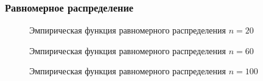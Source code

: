 \documentclass{article}
\begin{document}
\newpage
\subsubsection{Равномерное распределение}

\begin{figure}[h]
\caption{Эмпирическая функция равномерного распределения $n=20$}
\end{figure}

\begin{figure}[h]
\caption{Эмпирическая функция равномерного распределения $n=60$}
\end{figure}

\begin{figure}[h]
\caption{Эмпирическая функция равномерного распределения $n=100$}
\end{figure}
\end{document}
